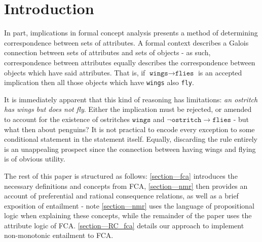 \section{Introduction}
In part, implications in formal concept analysis presents a method of determining correspondence between sets of attributes. A formal context describes a Galois connection between sets of attributes and sets of objects - as such, correspondence between attributes equally describes the correspondence between objects which have said attributes. That is, if $\texttt{wings} \rightarrow \texttt{flies}$ is an accepted implication then all those objects which have \texttt{wings} also \texttt{fly}.

It is immediately apparent that this kind of reasoning has limitations: \textit{an ostritch has wings but does not fly}. Either the implication must be rejected, or amended to account for the existence of ostritches $\texttt{wings}$ and $\neg \texttt{ostritch} \rightarrow \texttt{flies}$ - but what then about penguins? It is not practical to encode every exception to some conditional statement in the statement itself. Equally, discarding the rule entirely is an unappealing prospect since the connection between having wings and flying is of obvious utility.

The rest of this paper is structured as follows: \autoref{section—fca} introduces the necessary definitions and concepts from FCA, \autoref{section—nmr} then provides an account of preferential and rational consequence relations, as well as a brief exposition of entailment - note \autoref{section—nmr} uses the language of propositional logic when explaining these concepts, while the remainder of the paper uses the attribute logic of FCA. \autoref{section—RC_fca} details our approach to implement non-monotonic entailment to FCA.